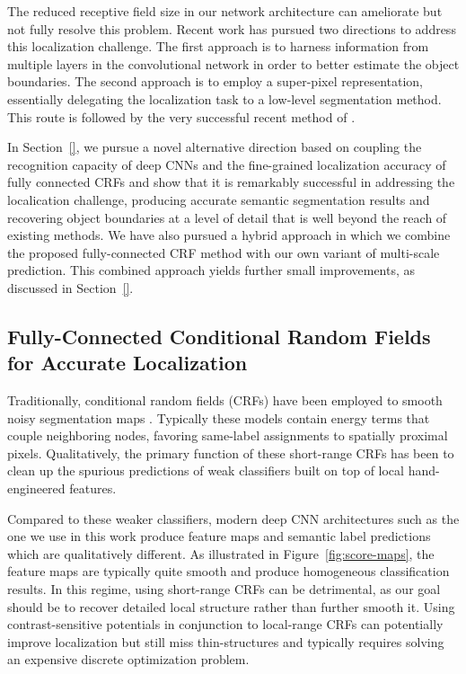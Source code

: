 The reduced receptive field size in our network architecture can ameliorate
but not fully resolve this problem. Recent work has pursued two directions to
address this localization challenge. The first approach is to harness
information from multiple layers in the convolutional network in order to
better estimate the object boundaries. The second approach is
to employ a super-pixel representation, essentially delegating the
localization task to a low-level segmentation method. This route is followed
by the very successful recent method of \cite{Greg}.

In Section~\ref{}, we pursue a novel alternative direction based on coupling
the recognition capacity of deep CNNs and the fine-grained localization
accuracy of fully connected CRFs and show that it is remarkably successful in
addressing the localication challenge, producing accurate semantic
segmentation results and recovering object boundaries at a level of detail
that is well beyond the reach of existing methods.  We have also pursued a
hybrid approach in which we combine the proposed fully-connected CRF method
with our own variant of multi-scale prediction. This combined approach yields
further small improvements, as discussed in Section~\ref{}. 

\subsection{Fully-Connected Conditional Random Fields for Accurate Localization}
\label{sec:dense-crf}

Traditionally, conditional random fields (CRFs) have been employed to smooth
noisy segmentation maps \cite{rother2004grabcut, kohli2009robust}. Typically
these models contain energy terms that couple neighboring nodes, favoring
same-label assignments to spatially proximal pixels. Qualitatively, the
primary function of these short-range CRFs has been to clean up the spurious
predictions of weak classifiers built on top of local hand-engineered features.

Compared to these weaker classifiers, modern deep CNN architectures such as
the one we use in this work produce feature maps and semantic label
predictions which are qualitatively different. As illustrated in
Figure~\ref{fig:score-maps}, the feature maps are typically quite smooth and
produce homogeneous classification results. In this regime, using short-range
CRFs can be detrimental, as our goal should be to recover detailed local
structure rather than further smooth it. Using contrast-sensitive potentials
\cite{rother2004grabcut} in conjunction to local-range CRFs can potentially
improve localization but still miss thin-structures and typically requires
solving an expensive discrete optimization problem.

